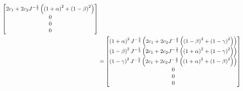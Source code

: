 \begin{equation}
\begin{split}
\begin{bmatrix}
      2c_{1}+2c_{2}J^{-\frac{2}{3}}\left( \left( 1+\alpha \right)^{2}+\left( 1-\beta \right)^{2} \right) \\
      0 \\
      0 \\
      0
    \end{bmatrix}\\
    &=\begin{bmatrix}
      \left( 1+\alpha \right)^{2}J^{-\frac{5}{3}}\left( 2c_{1}+2c_{2}J^{-\frac{2}{3}}\left( \left( 1-\beta \right)^{2}+\left( 1-\gamma \right)^{2} \right) \right) \\
      \left( 1-\beta \right)^{2}J^{-\frac{5}{3}}\left( 2c_{1}+2c_{2}J^{-\frac{2}{3}}\left( \left( 1+\alpha \right)^{2}+\left( 1-\gamma \right)^{2} \right) \right) \\
      \left( 1-\gamma \right)^{2}J^{-\frac{5}{3}}\left( 2c_{1}+2c_{2}J^{-\frac{2}{3}}\left( \left( 1+\alpha \right)^{2}+\left( 1-\beta \right)^{2} \right) \right) \\
       0\\
       0\\
      0
    \end{bmatrix}
  \end{split}
\end{equation}

